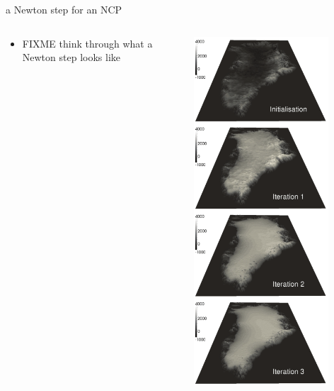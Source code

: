 \documentclass[10pt,hyperref,dvipsnames]{beamer}
\begin{document}
\begin{frame}{a Newton step for an NCP}

\begin{columns}
\begin{column}{0.7\textwidth}
\begin{itemize}
\item FIXME think through what a Newton step looks like
\end{itemize}
\end{column}
\begin{column}{0.3\textwidth}
\hfill \includegraphics[width=0.8\textwidth]{figs/GISsequence.png} \hfill
\end{column}
\end{columns}
\end{frame}
\end{document}
